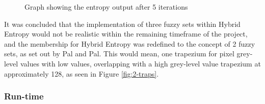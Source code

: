 \begin{figure}[H]
  \begin{center}
    \end{center}
    \caption{Graph showing the entropy output after 5 iterations}
    \label{fig:minus-entropy}
\end{figure}

It was concluded that the implementation of three fuzzy sets within Hybrid Entropy would not be realistic within the remaining timeframe of the project, and the membership for Hybrid Entropy was redefined to the concept of 2 fuzzy sets, as set out by Pal and Pal. This would mean, one trapezium for pixel grey-level values with low values, overlapping with a high grey-level value trapezium at approximately 128, as seen in Figure \ref{fig:2-traps}.

\subsubsection{Run-time}
